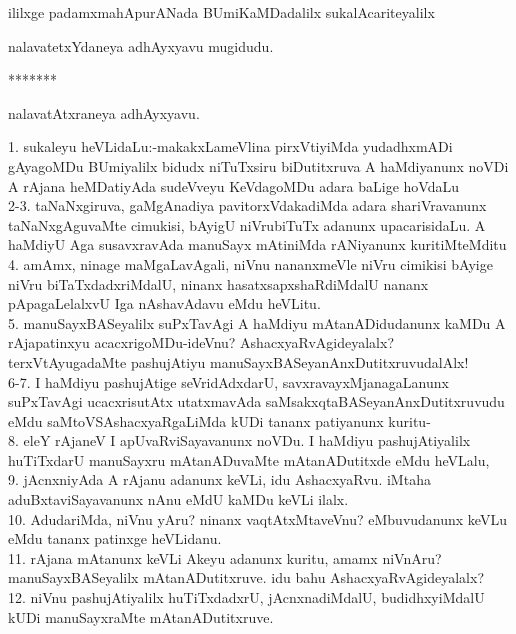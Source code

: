 \documentclass{article}
\begin{document}
\begin{center}
ililxge padamxmahApurANada BUmiKaMDadalilx sukalAcariteyalilx
\end{center}
\begin{center}
nalavatetxYdaneya adhAyxyavu mugidudu.
\end{center}

\begin{center}
*******
\end{center}

\begin{center}
nalavatAtxraneya adhAyxyavu.
\end{center}

1. sukaleyu heVLidaLu:-makakxLameVlina pirxVtiyiMda yudadhxmADi gAyagoMDu BUmiyalilx bidudx niTuTxsiru biDutitxruva A haMdiyanunx noVDi A rAjana heMDatiyAda sudeVveyu KeVdagoMDu adara baLige hoVdaLu\\
2-3. taNaNxgiruva, gaMgAnadiya pavitorxVdakadiMda adara shariVravanunx taNaNxgAguvaMte cimukisi, bAyigU niVrubiTuTx adanunx upacarisidaLu. A haMdiyU Aga susavxravAda manuSayx mAtiniMda rANiyanunx kuritiMteMditu\\
4. amAmx, ninage maMgaLavAgali, niVnu nananxmeVle niVru cimikisi bAyige niVru biTaTxdadxriMdalU, ninanx hasatxsapxshaRdiMdalU nananx pApagaLelalxvU Iga nAshavAdavu eMdu heVLitu.\\
5. manuSayxBASeyalilx suPxTavAgi A haMdiyu mAtanADidudanunx kaMDu A rAjapatinxyu acacxrigoMDu-ideVnu? AshacxyaRvAgideyalalx?terxVtAyugadaMte pashujAtiyu manuSayxBASeyanAnxDutitxruvudalAlx!\\
6-7. I haMdiyu pashujAtige seVridAdxdarU, savxravayxMjanagaLanunx suPxTavAgi ucacxrisutAtx utatxmavAda saMsakxqtaBASeyanAnxDutitxruvudu eMdu saMtoVSAshacxyaRgaLiMda kUDi tananx patiyanunx kuritu-\\
8. eleY rAjaneV I apUvaRviSayavanunx noVDu. I haMdiyu pashujAtiyalilx huTiTxdarU manuSayxru mAtanADuvaMte mAtanADutitxde eMdu heVLalu,\\
9. jAcnxniyAda A rAjanu adanunx keVLi, idu AshacxyaRvu. iMtaha aduBxtaviSayavanunx nAnu eMdU kaMDu keVLi ilalx.\\
10. AdudariMda, niVnu yAru? ninanx vaqtAtxMtaveVnu? eMbuvudanunx keVLu eMdu tananx patinxge heVLidanu.\\
11. rAjana mAtanunx keVLi Akeyu adanunx kuritu, amamx niVnAru? manuSayxBASeyalilx mAtanADutitxruve. idu bahu AshacxyaRvAgideyalalx?\\
12. niVnu pashujAtiyalilx huTiTxdadxrU, jAcnxnadiMdalU, budidhxyiMdalU kUDi manuSayxraMte mAtanADutitxruve.\\
\end{document}
